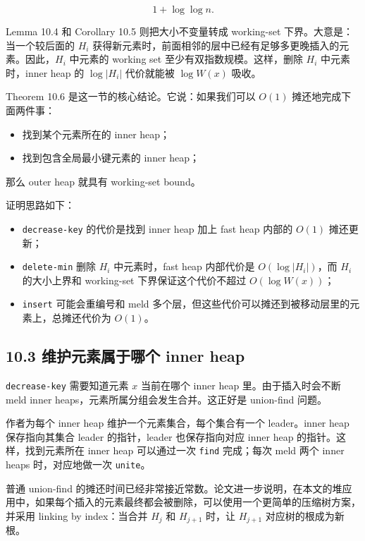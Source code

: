 \documentclass[UTF8]{ctexart}
\begin{document}
\[
1+\log\log n.
\]

Lemma 10.4 和 Corollary 10.5 则把大小不变量转成 working-set 下界。大意是：当一个较后面的 \(H_i\) 获得新元素时，前面相邻的层中已经有足够多更晚插入的元素。因此，\(H_i\) 中元素的 working set 至少有双指数规模。这样，删除 \(H_i\) 中元素时，inner heap 的 \(\log |H_i|\) 代价就能被 \(\log W(x)\) 吸收。

Theorem 10.6 是这一节的核心结论。它说：如果我们可以 \(O(1)\) 摊还地完成下面两件事：

\begin{itemize}
  \item 找到某个元素所在的 inner heap；
  \item 找到包含全局最小键元素的 inner heap；
\end{itemize}

那么 outer heap 就具有 working-set bound。

证明思路如下：

\begin{itemize}
  \item \texttt{decrease-key} 的代价是找到 inner heap 加上 fast heap 内部的 \(O(1)\) 摊还更新；
  \item \texttt{delete-min} 删除 \(H_i\) 中元素时，fast heap 内部代价是 \(O(\log |H_i|)\)，而 \(H_i\) 的大小上界和 working-set 下界保证这个代价不超过 \(O(\log W(x))\)；
  \item \texttt{insert} 可能会重编号和 meld 多个层，但这些代价可以摊还到被移动层里的元素上，总摊还代价为 \(O(1)\)。
\end{itemize}

\subsection*{10.3 维护元素属于哪个 inner heap}

\texttt{decrease-key} 需要知道元素 \(x\) 当前在哪个 inner heap 里。由于插入时会不断 meld inner heaps，元素所属分组会发生合并。这正好是 union-find 问题。

作者为每个 inner heap 维护一个元素集合，每个集合有一个 leader。inner heap 保存指向其集合 leader 的指针，leader 也保存指向对应 inner heap 的指针。这样，找到元素所在 inner heap 可以通过一次 \texttt{find} 完成；每次 meld 两个 inner heaps 时，对应地做一次 \texttt{unite}。

普通 union-find 的摊还时间已经非常接近常数。论文进一步说明，在本文的堆应用中，如果每个插入的元素最终都会被删除，可以使用一个更简单的压缩树方案，并采用 linking by index：当合并 \(H_j\) 和 \(H_{j+1}\) 时，让 \(H_{j+1}\) 对应树的根成为新根。
\end{document}
